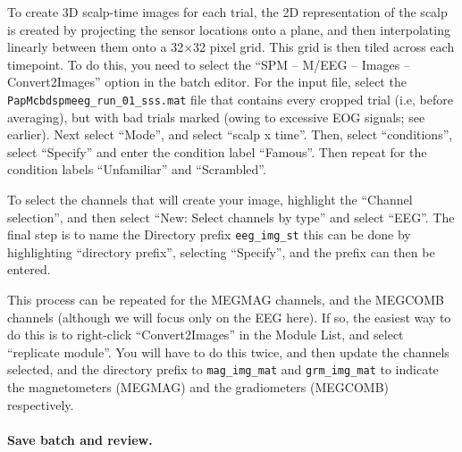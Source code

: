 To create 3D scalp-time images for each trial, the 2D representation of the scalp is created by projecting the sensor locations onto a plane, and then interpolating linearly between them onto a 32\(\times\)32 pixel grid. This grid is then tiled across each timepoint. To do this, you need to select the ``SPM -- M/EEG -- Images -- Convert2Images'' option in the batch editor. For the input file, select the \texttt{PapMcbdspmeeg\_run\_01\_sss.mat} file that contains every cropped trial (i.e, before averaging), but with bad trials marked (owing to excessive EOG signals; see earlier). Next select ``Mode'', and select ``scalp x time''. Then, select ``conditions'', select ``Specify'' and enter the condition label ``Famous''. Then repeat for the condition labels ``Unfamiliar'' and ``Scrambled''. 

To select the channels that will create your image, highlight the ``Channel selection'', and then select ``New: Select channels by type'' and select ``EEG''. The final step is to name the Directory prefix \texttt{eeg\_img\_st} this can be done by highlighting ``directory prefix'', selecting ``Specify'', and the prefix can then be entered.

This process can be repeated for the MEGMAG channels, and the MEGCOMB channels (although we will focus only on the EEG here). If so, the easiest way to do this is to right-click ``Convert2Images'' in the Module List, and select ``replicate module''. You will have to do this twice, and then update the channels selected, and the directory prefix to \texttt{mag\_img\_mat} and \texttt{grm\_img\_mat} to indicate the magnetometers (MEGMAG) and the gradiometers (MEGCOMB) respectively. 

\paragraph{Save batch and review.}

